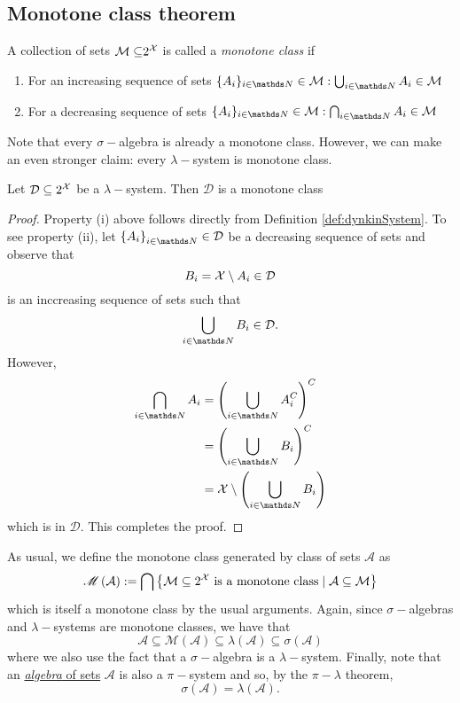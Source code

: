 \subsection{Monotone class theorem}
\begin{defn}
\label{def:monotoneClass} A collection of sets $\mathcal{M\subseteq}2^{\mathcal{X}}$
is called a \emph{monotone class }if

\begin{enumerate}[label=(\roman*),leftmargin=.1\linewidth,rightmargin=.4\linewidth]
	\item For an increasing sequence of sets $ \{A_i\}_{i\in\N} \in \mathcal{M}: \bigcup_{i\in\N}A_i \in \mathcal{M} $
	\item For a decreasing sequence of sets $ \{A_i\}_{i\in\N} \in \mathcal{M}: \bigcap_{i\in\N}A_i \in \mathcal{M} $
\end{enumerate}
\end{defn}

Note that every $\sigma-$algebra is already a monotone class. However,
we can make an even stronger claim: every $\lambda-$system is monotone
class.
\begin{prop}
\label{prop:dynkinSystemIsMonotoneClass} Let $\mathcal{D}\subseteq2^{\mathcal{X}}$
be a $\lambda-$system. Then $\mathcal{D}$ is a monotone class
\end{prop}

\begin{proof}
Property (i) above follows directly from Definition \ref{def:dynkinSystem}.
To see property (ii), let $\left\{ A_{i}\right\} _{i\in\N}\in\mathcal{D}$
be a decreasing sequence of sets and observe that 
\[
B_{i}=\mathcal{X}\setminus A_{i}\in\mathcal{D}
\]
is an inccreasing sequence of sets such that
\[
\bigcup_{i\in\N}B_{i}\in\mathcal{D}.
\]
However, 
\begin{align*}
\bigcap_{i\in\N}A_{i} & =\left(\bigcup_{i\in\N}A_{i}^{C}\right)^{C}\\
 & =\left(\bigcup_{i\in\N}B_{i}\right)^{C}\\
 & =\X\setminus\left(\bigcup_{i\in\N}B_{i}\right)
\end{align*}
which is in $\mathcal{D}$. This completes the proof.
\end{proof}
As usual, we define the monotone class generated by class of sets
$\mathcal{A}$ as 
\[
\mathscr{M}\left(\mathcal{A}\right):=\bigcap\left\{ \mathcal{M}\subseteq2^{\mathcal{X}}\text{ is a monotone class}\mid\mathcal{A}\subseteq\mathcal{M}\right\} 
\]
which is itself a monotone class by the usual arguments. Again, since
$\sigma-$algebras and $\lambda-$systems are monotone classes, we
have that
\[
\mathcal{A}\subseteq\mathscr{M}\left(\mathcal{A}\right)\subseteq\lambda\left(\mathcal{A}\right)\subseteq\sigma\left(\mathcal{A}\right)
\]
where we also use the fact that a $\sigma-$algebra is a $\lambda-$system.
Finally, note that an \hyperref[def:algebra]{\emph{algebra} of sets}
$\mathcal{A}$ is also a $\pi-$system and so, by the $\pi-\lambda$
theorem, 
\[
\sigma\left(\mathcal{A}\right)=\lambda\left(\mathcal{A}\right).
\]

